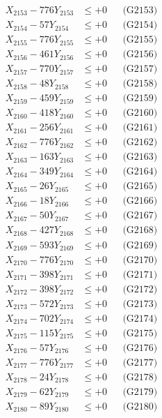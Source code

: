 \documentclass[a4paper,10pt]{article}
\begin{document}
{\begin{align}
X_{2153} - 776Y_{2153} &\leq +0 && \text{(G2153)} \\
X_{2154} - 57Y_{2154} &\leq +0 && \text{(G2154)} \\
X_{2155} - 776Y_{2155} &\leq +0 && \text{(G2155)} \\
X_{2156} - 461Y_{2156} &\leq +0 && \text{(G2156)} \\
X_{2157} - 770Y_{2157} &\leq +0 && \text{(G2157)} \\
X_{2158} - 48Y_{2158} &\leq +0 && \text{(G2158)} \\
X_{2159} - 459Y_{2159} &\leq +0 && \text{(G2159)} \\
X_{2160} - 418Y_{2160} &\leq +0 && \text{(G2160)} \\
\allowbreak
X_{2161} - 256Y_{2161} &\leq +0 && \text{(G2161)} \\
X_{2162} - 776Y_{2162} &\leq +0 && \text{(G2162)} \\
X_{2163} - 163Y_{2163} &\leq +0 && \text{(G2163)} \\
X_{2164} - 349Y_{2164} &\leq +0 && \text{(G2164)} \\
X_{2165} - 26Y_{2165} &\leq +0 && \text{(G2165)} \\
X_{2166} - 18Y_{2166} &\leq +0 && \text{(G2166)} \\
X_{2167} - 50Y_{2167} &\leq +0 && \text{(G2167)} \\
X_{2168} - 427Y_{2168} &\leq +0 && \text{(G2168)} \\
X_{2169} - 593Y_{2169} &\leq +0 && \text{(G2169)} \\
X_{2170} - 776Y_{2170} &\leq +0 && \text{(G2170)} \\
\allowbreak
X_{2171} - 398Y_{2171} &\leq +0 && \text{(G2171)} \\
X_{2172} - 398Y_{2172} &\leq +0 && \text{(G2172)} \\
X_{2173} - 572Y_{2173} &\leq +0 && \text{(G2173)} \\
X_{2174} - 702Y_{2174} &\leq +0 && \text{(G2174)} \\
X_{2175} - 115Y_{2175} &\leq +0 && \text{(G2175)} \\
X_{2176} - 57Y_{2176} &\leq +0 && \text{(G2176)} \\
X_{2177} - 776Y_{2177} &\leq +0 && \text{(G2177)} \\
X_{2178} - 24Y_{2178} &\leq +0 && \text{(G2178)} \\
X_{2179} - 62Y_{2179} &\leq +0 && \text{(G2179)} \\
X_{2180} - 89Y_{2180} &\leq +0 && \text{(G2180)} \\

\end{align}}
\end{document}
